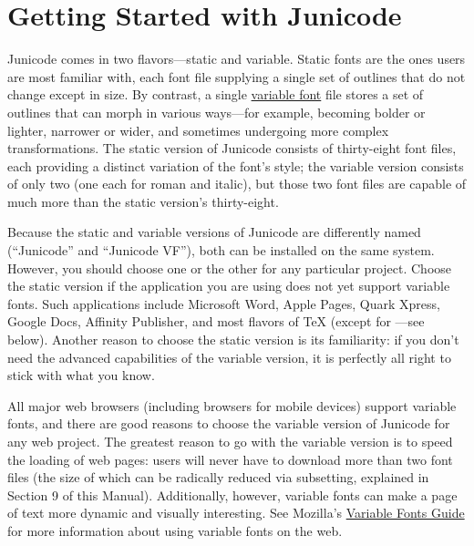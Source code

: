 
\chapter{Getting Started with Junicode}\hypertarget{GettingStarted}{}

Junicode comes in two flavors—static and variable. Static fonts are the ones
users are most familiar with, each font file supplying a single set of outlines
that do not change except in size. By contrast, a single
\href{https://fonts.google.com/knowledge/introducing_type/introducing_variable_fonts}{variable font}
file stores a set of
outlines that can morph in various ways—for example, becoming bolder or lighter,
narrower or wider, and sometimes undergoing more complex transformations. The static
version of Junicode consists of thirty-eight font files,
each providing a distinct variation of the font’s style; the variable version consists
of only two (one each for roman and italic), but those two font files are capable of
much more than the static version's thirty-eight.

Because the static and variable versions of Junicode are differently named
(“Junicode” and “Junicode VF”), both can be installed on the same system. However,
you should choose one or the other for any particular project. Choose the static
version if the application you are using does not yet support variable fonts. Such
applications include Microsoft Word, Apple Pages, Quark Xpress, Google Docs,
Affinity Publisher, and most flavors of {\TeX} (except for {\LuaTeX}—see below). Another
reason to choose the static version is its familiarity: if you don't need the
advanced capabilities of the variable version, it is perfectly all right to stick
with what you know.

All major web browsers (including browsers for mobile devices) support variable fonts,
and there are good reasons to choose
the variable version of Junicode for any web project. The greatest reason to go
with the variable version is to speed the loading of web pages: users will never
have to download more than two font files (the size of which can be radically
reduced via subsetting, explained in Section 9 of this Manual). Additionally,
however, variable fonts can make a page of text more dynamic and visually
interesting. See Mozilla's
\href{https://developer.mozilla.org/en-US/docs/Web/CSS/CSS_fonts/Variable_fonts_guide}%
{Variable Fonts Guide} for more information about using variable fonts on the web.

